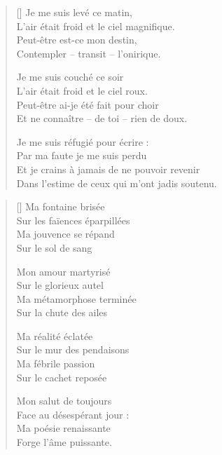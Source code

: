 \newpage

\settowidth{\versewidth}{Dans l'estime de ceux qui m'ont jadis soutenu.}
\begin{verse}[\versewidth]
Je me suis levé ce matin, \\
L'air était froid et le ciel magnifique. \\
Peut-être est-ce mon destin, \\
Contempler -- transit -- l'onirique.

Je me suis couché ce soir \\
L'air était froid et le ciel roux. \\
Peut-être ai-je été fait pour choir \\
Et ne connaître -- de toi – rien de doux.

Je me suis réfugié pour écrire : \\
Par ma faute je me suis perdu \\
Et je crains à jamais de ne pouvoir revenir \\
Dans l'estime de ceux qui m'ont jadis soutenu.
\end{verse}

\newpage

\settowidth{\versewidth}{Sur les faïences éparpillées}
\begin{verse}[\versewidth]
Ma fontaine brisée \\
Sur les faïences éparpillées \\
Ma jouvence se répand \\
Sur le sol de sang

Mon amour martyrisé \\
Sur le glorieux autel \\
Ma métamorphose terminée \\
Sur la chute des ailes

Ma réalité éclatée \\
Sur le mur des pendaisons \\
Ma fébrile passion \\
Sur le cachet reposée

Mon salut de toujours \\
Face au désespérant jour : \\
Ma poésie renaissante \\
Forge l'âme puissante.
\end{verse}


